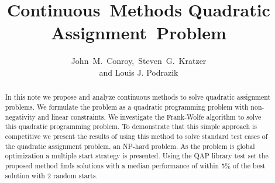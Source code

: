 \documentclass{amsart}
\title{Continuous~Methods  Quadratic
Assignment~Problem}
\author
{John~M.~Conroy,~Steven~G.~Kratzer \\ and Louis J. Podrazik}
\theoremstyle{plain} \newtheorem{Exa}{Example}[section]
\begin{document}

\begin {abstract}
In this note we propose and analyze continuous methods
to solve quadratic assignment problems.
We formulate the
problem as a quadratic programming problem with non-negativity and
linear constraints.
We investigate the Frank-Wolfe algorithm
to solve this quadratic programming problem.  To demonstrate that this
simple approach is competitive 
we present the results of using this method to
solve standard test cases of the quadratic assignment problem,
an NP-hard problem.  As the problem is global optimization a multiple
start strategy is presented.  Using the QAP library test set the proposed method
finds solutions with a median performance of within 5\% of the best solution
with 2 random starts.  
\end {abstract}
\maketitle


\newcommand{\myepsfdef}[4]{%
    \begin{figure}[#1]
        \centerline{\epsfxsize=5.3000in \epsfbox{#2.eps}}
        \caption{#3}
        \label{#4}
    \end{figure}%
}
%
\newcommand{\bigepsfdef}[4]{%
    \begin{figure}[#1]
        \centerline{\epsfxsize=1.500in \epsfbox{#2.eps}}
        \caption{#3}
        \label{#4}
    \end{figure}%
}
%
%
\renewcommand{\topfraction}{1.0}
\renewcommand{\bottomfraction}{1.0}
\renewcommand{\textfraction}{0.0}

% 
% 
\end{document}
